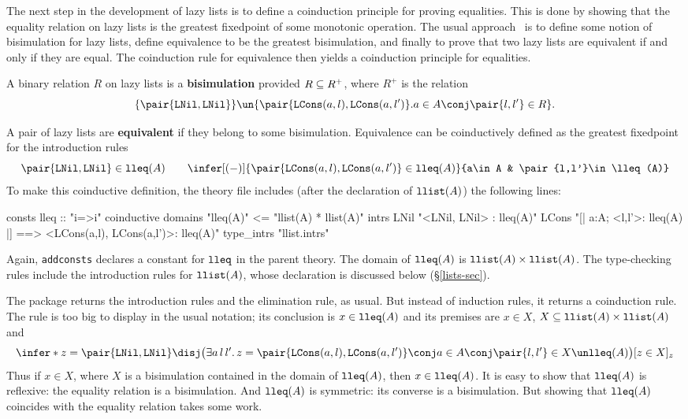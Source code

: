 The next step in the development of lazy lists is to define a coinduction
principle for proving equalities.  This is done by showing that the equality
relation on lazy lists is the greatest fixedpoint of some monotonic
operation.  The usual approach~\cite{pitts94} is to define some notion of 
bisimulation for lazy lists, define equivalence to be the greatest
bisimulation, and finally to prove that two lazy lists are equivalent if and
only if they are equal.  The coinduction rule for equivalence then yields a
coinduction principle for equalities.

A binary relation $R$ on lazy lists is a {\bf bisimulation} provided $R\subseteq
R^+$, where $R^+$ is the relation
\[ \{\pair{\LNil,\LNil}\} \un 
   \{\pair{\LCons(a,l),\LCons(a,l')} . a\in A \conj \pair{l,l'}\in R\}.
\]

A pair of lazy lists are {\bf equivalent} if they belong to some bisimulation. 
Equivalence can be coinductively defined as the greatest fixedpoint for the
introduction rules
\[  \pair{\LNil,\LNil} \in\lleq(A)  \qquad 
    \infer[(-)]{\pair{\LCons(a,l),\LCons(a,l')} \in\lleq(A)}
          {a\in A & \pair{l,l'}\in \lleq(A)}
\]
To make this coinductive definition, the theory file includes (after the
declaration of $\hbox{\tt llist}(A)$) the following lines:
\begin{ttbox}
consts    lleq :: "i=>i"
coinductive
  domains "lleq(A)" <= "llist(A) * llist(A)"
  intrs
    LNil  "<LNil, LNil> : lleq(A)"
    LCons "[| a:A; <l,l'>: lleq(A) |] ==> <LCons(a,l), LCons(a,l')>: lleq(A)"
  type_intrs  "llist.intrs"
\end{ttbox}
Again, {\tt addconsts} declares a constant for $\hbox{\tt lleq}$ in the parent theory. 
The domain of $\hbox{\tt lleq}(A)$ is $\hbox{\tt llist}(A)\times\hbox{\tt llist}(A)$.  The type-checking
rules include the introduction rules for $\hbox{\tt llist}(A)$, whose 
declaration is discussed below (\S\ref{lists-sec}).

The package returns the introduction rules and the elimination rule, as
usual.  But instead of induction rules, it returns a coinduction rule.
The rule is too big to display in the usual notation; its conclusion is
$x\in\hbox{\tt lleq}(A)$ and its premises are $x\in X$, 
${X\subseteq\hbox{\tt llist}(A)\times\hbox{\tt llist}(A)}$ and
\[ \infer*{z=\pair{\LNil,\LNil}\disj \bigl(\exists a\,l\,l'.\,
      z=\pair{\LCons(a,l),\LCons(a,l')} \conj 
      a\in A \conj\pair{l,l'}\in X\un\lleq(A) \bigr)
    }{[z\in X]_z}
\]
Thus if $x\in X$, where $X$ is a bisimulation contained in the
domain of $\hbox{\tt lleq}(A)$, then $x\in\hbox{\tt lleq}(A)$.  It is easy to show that
$\hbox{\tt lleq}(A)$ is reflexive: the equality relation is a bisimulation.  And
$\hbox{\tt lleq}(A)$ is symmetric: its converse is a bisimulation.  But showing that
$\hbox{\tt lleq}(A)$ coincides with the equality relation takes some work.

